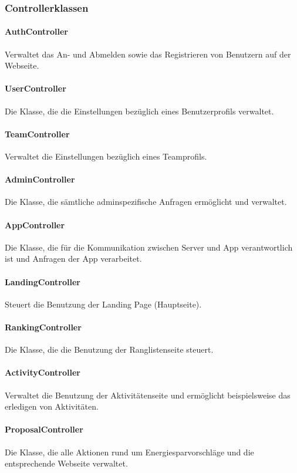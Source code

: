 \subsubsection{Controllerklassen}
	\paragraph{AuthController}Verwaltet das An- und Abmelden sowie das Registrieren von Benutzern auf der Webseite.
	\paragraph{UserController}Die Klasse, die die Einstellungen bez\"uglich eines Benutzerprofils verwaltet.
	\paragraph{TeamController}Verwaltet die Einstellungen bez\"uglich eines Teamprofils.
	\paragraph{AdminController}Die Klasse, die s\"amtliche adminspezifische Anfragen erm\"oglicht und verwaltet.
	\paragraph{AppController}Die Klasse, die f\"ur die Kommunikation zwischen Server und App verantwortlich ist und Anfragen der App verarbeitet.
	\paragraph{LandingController}Steuert die Benutzung der Landing Page (Hauptseite).
	\paragraph{RankingController}Die Klasse, die die Benutzung der Ranglistenseite steuert.
	\paragraph{ActivityController}Verwaltet die Benutzung der Aktivit\"atenseite und erm\"oglicht beispielsweise das erledigen von Aktivit\"aten.
	\paragraph{ProposalController}Die Klasse, die alle Aktionen rund um Energiesparvorschl\"age und die entsprechende Webseite verwaltet.
